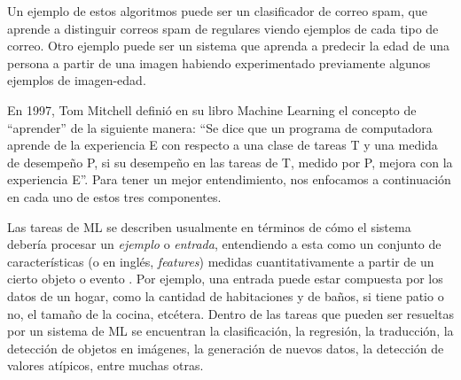 \documentclass[../../main.tex]{subfiles}
\begin{document}
Un ejemplo de estos algoritmos puede ser un clasificador de correo spam, que aprende a
distinguir correos spam de regulares viendo ejemplos de cada tipo de correo. Otro ejemplo
puede ser un sistema que aprenda a predecir la edad de una persona a partir de una imagen
habiendo experimentado previamente algunos ejemplos de imagen-edad.

En 1997, Tom Mitchell definió en su libro Machine Learning \cite{ml-tom-mitchell} el
concepto de ``aprender'' de la siguiente manera: ``Se dice que un programa de computadora
aprende de la experiencia E con respecto a una clase de tareas T y una medida de desempeño
P, si su desempeño en las tareas de T, medido por P, mejora con la experiencia E''. Para
tener un mejor entendimiento, nos enfocamos a continuación en cada uno de estos tres
componentes.

Las tareas de ML se describen usualmente en términos de cómo el sistema debería procesar
un \textit{ejemplo} o \textit{entrada}, entendiendo a esta como un conjunto de
características (o en inglés, \textit{features}) medidas cuantitativamente a partir de un
cierto objeto o evento \cite{deep-learning}. Por ejemplo, una entrada puede estar
compuesta por los datos de un hogar, como la cantidad de habitaciones y de baños, si tiene
patio o no, el tamaño de la cocina, etcétera. Dentro de las tareas que pueden ser
resueltas por un sistema de ML se encuentran la clasificación, la regresión, la
traducción, la detección de objetos en imágenes, la generación de nuevos datos, la
detección de valores atípicos, entre muchas otras.
\end{document}
